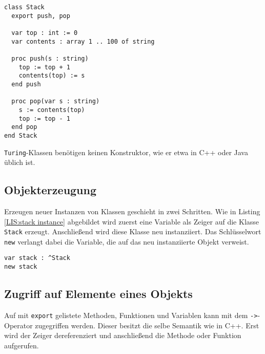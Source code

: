 \lstset{label=LIS:stack class}
\begin{table}[h!]
\begin{lstlisting}
class Stack
  export push, pop
  
  var top : int := 0
  var contents : array 1 .. 100 of string

  proc push(s : string)
    top := top + 1
    contents(top) := s
  end push

  proc pop(var s : string)
    s := contents(top)
    top := top - 1
  end pop
end Stack
\end{lstlisting}
\end{table}

\texttt{Turing}-Klassen ben\"otigen keinen Konstruktor, wie er etwa in C++ oder Java \"ublich ist.

\subsection{Objekterzeugung}
\label{LBL:object-creation}

Erzeugen neuer Instanzen von Klassen geschieht in zwei Schritten. Wie in Listing \ref{LIS:stack instance} abgebildet wird zuerst eine Variable als Zeiger auf die Klasse \texttt{Stack} erzeugt. Anschlie\ss{}end wird diese Klasse neu instanziiert. Das Schl\"usselwort \lstinline{new} verlangt dabei die Variable, die auf das neu instanziierte Objekt verweist.

\lstset{label=LIS:stack instance}
\begin{table}[h!]
\begin{lstlisting}
var stack : ^Stack
new stack
\end{lstlisting}
\end{table}

\subsection{Zugriff auf Elemente eines Objekts}

Auf mit \lstinline{export} gelistete Methoden, Funktionen und Variablen kann mit dem \texttt{->}-Operator zugegriffen werden. Dieser besitzt die selbe Semantik wie in C++. Erst wird der Zeiger dereferenziert und anschlie\ss{}end die Methode oder Funktion aufgerufen. 

